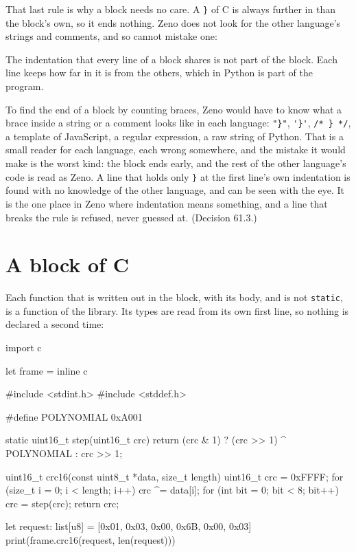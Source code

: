 That last rule is why a block needs no care. A \verb|}| of C is
always further in than the block's own, so it ends nothing. Zeno does
not look for the other language's strings and comments, and so cannot
mistake one:

\begin{zeno}[file=odd.zeno, dir=blocks]
import c

let odd = inline c {
    /* A } in a comment, */
    const char *closing(void) { return "} and one in a text"; }
}

print(odd.closing())
\end{zeno}

The indentation that every line of a block shares is not part of the
block. Each line keeps how far in it is from the others, which in
Python is part of the program.

\begin{why}
To find the end of a block by counting braces, Zeno would have to know
what a brace inside a string or a comment looks like in each language:
\verb|"}"|, \verb|'}'|, \verb|/* } */|, a template of JavaScript, a
regular expression, a raw string of Python. That is a small reader for
each language, each wrong somewhere, and the mistake it would make is
the worst kind: the block ends early, and the rest of the other
language's code is read as Zeno. A line that holds only \verb|}| at
the first line's own indentation is found with no knowledge of the
other language, and can be seen with the eye. It is the one place in
Zeno where indentation means something, and a line that breaks the
rule is refused, never guessed at. (Decision 61.3.)
\end{why}

\section{A block of C}

Each function that is written out in the block, with its body, and is
not \verb|static|, is a function of the library. Its types are read
from its own first line, so nothing is declared a second time:

\begin{zeno}[file=frame.zeno, dir=blocks]
import c

let frame = inline c {
    #include <stdint.h>
    #include <stddef.h>

    #define POLYNOMIAL 0xA001

    static uint16_t step(uint16_t crc) {
        return (crc & 1) ? (crc >> 1) ^ POLYNOMIAL : crc >> 1;
    }

    uint16_t crc16(const uint8_t *data, size_t length) {
        uint16_t crc = 0xFFFF;
        for (size_t i = 0; i < length; i++) {
            crc ^= data[i];
            for (int bit = 0; bit < 8; bit++) {
                crc = step(crc);
            }
        }
        return crc;
    }
}

let request: list[u8] = [0x01, 0x03, 0x00, 0x6B, 0x00, 0x03]
print(frame.crc16(request, len(request)))
\end{zeno}

